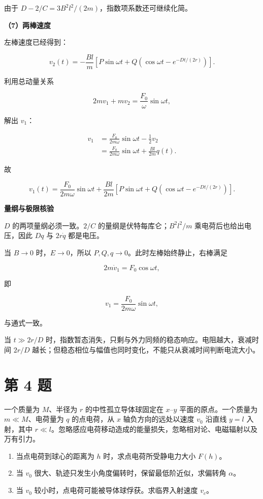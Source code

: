 \documentclass[12pt,a4paper,UTF8]{ctexart}
\newcommand{\tightlist}{\setlength{\itemsep}{0pt}\setlength{\parskip}{0pt}}
\begin{document}
由于 \(D-2/C=3B^2l^2/(2m)\)，指数项系数还可继续化简。

\textbf{（7）两棒速度}

左棒速度已经得到：

\[
\boxed{
v_2(t)=-\frac{Bl}{m}\left[P\sin\omega t+Q\left(\cos\omega t-e^{-Dt/(2r)}\right)\right]
}.
\]

利用总动量关系

\[2mv_1+mv_2=\frac{F_0}{\omega}\sin\omega t,\]

解出 \(v_1\)：

\[
\begin{aligned}
v_1
&=\frac{F_0}{2m\omega}\sin\omega t-\frac12v_2\\
&=\frac{F_0}{2m\omega}\sin\omega t+\frac{Bl}{2m}q(t).
\end{aligned}
\]

故

\[
\boxed{
v_1(t)=\frac{F_0}{2m\omega}\sin\omega t
+\frac{Bl}{2m}\left[P\sin\omega t+Q\left(\cos\omega t-e^{-Dt/(2r)}\right)\right]
}.
\]

\textbf{量纲与极限核验}

\(D\) 的两项量纲必须一致。\(2/C\) 的量纲是伏特每库仑；\(B^2l^2/m\)
乘电荷后也给出电压，因此 \(Dq\) 与 \(2r\dot q\) 都是电压。

当 \(B\to0\) 时，\(E\to0\)，所以
\(P,Q,q\to0\)。此时左棒始终静止，右棒满足

\[2m\dot v_1=F_0\cos\omega t,\]

即

\[v_1=\frac{F_0}{2m\omega}\sin\omega t,\]

与通式一致。

当 \(t\gg2r/D\)
时，指数暂态消失，只剩与外力同频的稳态响应。电阻越大，衰减时间 \(2r/D\)
越长；但稳态相位与幅值也同时变化，不能只从衰减时间判断电流大小。

\newpage

\section{第 4 题}\label{ux7b2c-4-ux9898}

一个质量为 \(M\)、半径为 \(r\) 的中性孤立导体球固定在 \(x\)--\(y\)
平面的原点。一个质量为 \(m\ll M\)、电荷量为 \(q\) 的点电荷，从 \(x\)
轴负方向的远处以速度 \(v_0\) 沿直线 \(y=l\) 入射，其中
\(r\ll l\)。忽略感应电荷移动造成的能量损失，忽略相对论、电磁辐射以及万有引力。

\begin{enumerate}
\def\labelenumi{\arabic{enumi}.}
\tightlist
\item
  当点电荷到球心的距离为 \(h\) 时，求点电荷所受静电力大小 \(F(h)\)。
\item
  当 \(v_0\) 很大、轨迹只发生小角度偏转时，保留最低阶近似，求偏转角
  \(\alpha\)。
\item
  当 \(v_0\) 较小时，点电荷可能被导体球俘获。求临界入射速度 \(v_c\)。
\end{enumerate}
\end{document}
